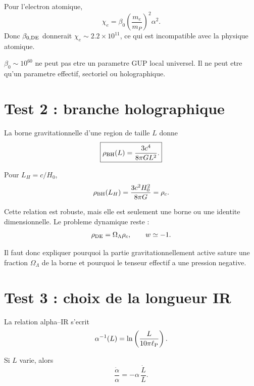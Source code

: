\documentclass[11pt,a4paper]{article}
\newcommand{\lp}{\ell_{\rm P}}
\newcommand{\rhoDE}{\rho_{\rm DE}}
\newcommand{\rhoBH}{\rho_{\rm BH}}
\begin{document}
Pour l'electron atomique,
\begin{equation}
\chi_e=\beta_0\left(\frac{m_e}{m_P}\right)^2\alpha^2.
\end{equation}
Donc \(\beta_{0,\rm DE}\) donnerait \(\chi_e\sim2.2\times10^{11}\), ce qui est
incompatible avec la physique atomique.

\begin{tcolorbox}[colback=red!3!white,colframe=red!50!black,title=Conclusion]
\(\beta_0\sim10^{60}\) ne peut pas etre un parametre GUP local universel. Il ne
peut etre qu'un parametre effectif, sectoriel ou holographique.
\end{tcolorbox}

\section{Test 2 : branche holographique}

La borne gravitationnelle d'une region de taille \(L\) donne
\begin{equation}
\boxed{
\rhoBH(L)=\frac{3c^4}{8\pi G L^2}.
}
\end{equation}

Pour \(L_H=c/H_0\),
\begin{equation}
\rhoBH(L_H)=\frac{3c^2H_0^2}{8\pi G}=\rho_c.
\end{equation}

Cette relation est robuste, mais elle est seulement une borne ou une identite
dimensionnelle. Le probleme dynamique reste :
\begin{equation}
\rhoDE=\Omega_\Lambda\rho_c,
\qquad
w\simeq -1.
\end{equation}

Il faut donc expliquer pourquoi la partie gravitationnellement active sature
une fraction \(\Omega_\Lambda\) de la borne et pourquoi le tenseur effectif a
une pression negative.

\section{Test 3 : choix de la longueur IR}

La relation alpha--IR s'ecrit
\begin{equation}
\alpha^{-1}(L)=\ln\left(\frac{L}{10\pi\lp}\right).
\end{equation}

Si \(L\) varie, alors
\begin{equation}
\frac{\dot\alpha}{\alpha}
=-\alpha\,\frac{\dot L}{L}.
\end{equation}
\end{document}

